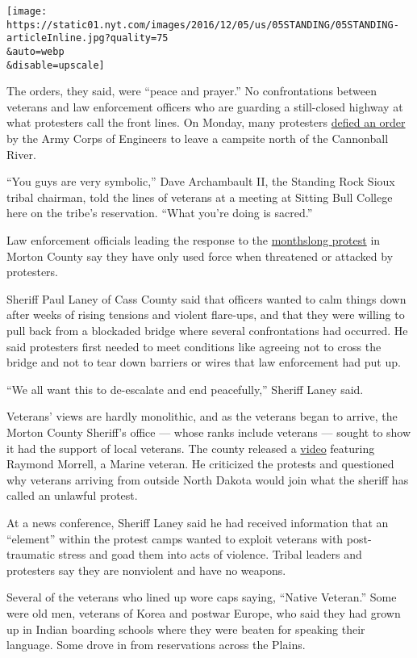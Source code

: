 \texttt{[image: https://static01.nyt.com/images/2016/12/05/us/05STANDING/05STANDING-articleInline.jpg?quality=75\\\&auto=webp\\\&disable=upscale]}

The orders, they said, were ``peace and prayer.'' No confrontations
between veterans and law enforcement officers who are guarding a
still-closed highway at what protesters call the front lines. On Monday,
many protesters
\href{http://www.nytimes.com/2016/11/26/us/dakota-pipeline-protest.html}{defied
an order} by the Army Corps of Engineers to leave a campsite north of
the Cannonball River.

``You guys are very symbolic,'' Dave Archambault II, the Standing Rock
Sioux tribal chairman, told the lines of veterans at a meeting at
Sitting Bull College here on the tribe's reservation. ``What you're
doing is sacred.''

Law enforcement officials leading the response to the
\href{http://www.nytimes.com/2016/10/29/us/dakota-access-pipeline-protest.html}{monthslong
protest} in Morton County say they have only used force when threatened
or attacked by protesters.

Sheriff Paul Laney of Cass County said that officers wanted to calm
things down after weeks of rising tensions and violent flare-ups, and
that they were willing to pull back from a blockaded bridge where
several confrontations had occurred. He said protesters first needed to
meet conditions like agreeing not to cross the bridge and not to tear
down barriers or wires that law enforcement had put up.

``We all want this to de-escalate and end peacefully,'' Sheriff Laney
said.

Veterans' views are hardly monolithic, and as the veterans began to
arrive, the Morton County Sheriff's office --- whose ranks include
veterans --- sought to show it had the support of local veterans. The
county released a
\href{https://www.youtube.com/watch?v=C1WzkHhSDPY}{video} featuring
Raymond Morrell, a Marine veteran. He criticized the protests and
questioned why veterans arriving from outside North Dakota would join
what the sheriff has called an unlawful protest.

At a news conference, Sheriff Laney said he had received information
that an ``element'' within the protest camps wanted to exploit veterans
with post-traumatic stress and goad them into acts of violence. Tribal
leaders and protesters say they are nonviolent and have no weapons.

Several of the veterans who lined up wore caps saying, ``Native
Veteran.'' Some were old men, veterans of Korea and postwar Europe, who
said they had grown up in Indian boarding schools where they were beaten
for speaking their language. Some drove in from reservations across the
Plains.

